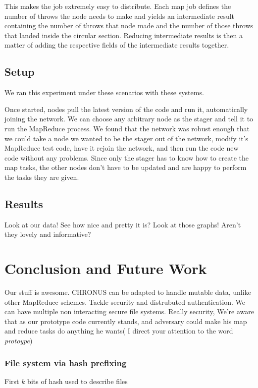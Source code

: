 \documentclass[conference, compsocconf, letterpaper]{IEEEtran}
\begin{document}
This makes the job extremely easy to distribute.  Each map job defines the number of throws the node needs to make and yields an intermediate result containing the number of throws that node made and the number of those throws that landed inside the circular section.  Reducing intermediate results is then a matter of adding the respective fields of the intermediate results together. 

\subsection{Setup}
We ran this experiment under these scenarios with these systems.

Once started, nodes pull the latest version of the code and run it, automatically joining the network.  We can choose any arbitrary node as the stager and tell it to run the MapReduce process. We found that the network was robust enough that we could take a node we wanted to be the stager out of the network, modify it's MapReduce test code, have it rejoin the network, and then run the code new code without any problems. Since only the stager has to know how to create the map tasks, the other nodes don't have to be updated and are happy to perform the tasks they are given.

\subsection{Results}
Look at our data! See how nice and pretty it is?  Look at those graphs!  Aren't they lovely and informative? 



\section{Conclusion and Future Work}
Our stuff \cite{code} is awesome.
CHRONUS can be adapted to handle mutable data, unlike other MapReduce schemes.
Tackle security and distrubuted authentication.
We can have multiple non interacting secure file systems.
Really security,  We're aware that as our prototype code currently stands, and adversary could make his map and reduce tasks do anything he wants(   I direct your attention to the word \emph{protoype})


\subsubsection{File system via hash prefixing}
First $k$ bits of hash used to describe files




\end{document}

